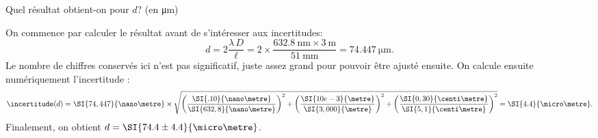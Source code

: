 \begin{enonce}
Quel résultat obtient-on pour $d$? (en \si{\micro\metre})
\end{enonce}


\begin{corrige}
On commence par calculer le résultat avant de s'intéresser aux incertitudes:
\[
d=2\frac{\lambda\,D}{\ell}= 
2\times\frac{\SI{632,8}{\nano\metre}\times\SI{3}{\metre}}{\SI{51}{\milli\metre}}=\SI{74,447}{\micro\metre}.
\]
Le nombre de chiffres conservés ici n'est pas significatif, juste assez grand pour pouvoir être ajusté ensuite. On calcule ensuite numériquement l'incertitude :
\[
\incertitude(d)=
\SI{74,447}{\nano\metre} \times\sqrt{
\left(\frac{\SI{.10}{\nano\metre}}{\SI{632,8}{\nano\metre}}\right)^2 +
\left(\frac{\SI{ 10e-3}{\metre}}{\SI{3,000}{\metre}}\right)^2 + \left(\frac{\SI{ 0,30}{\centi\metre}}{\SI{5,1}{\centi\metre}}\right)^2 }
= \SI{4.4}{\micro\metre}. 
\]
Finalement, on obtient \( d =\SI{74.4 \pm 4.4}{\micro\metre} \).
\end{corrige}



\finEntrainement



\newpage







\hauteurLargeurCadreReponse		{7mm}{4cm}
\initialisationEntrainement



